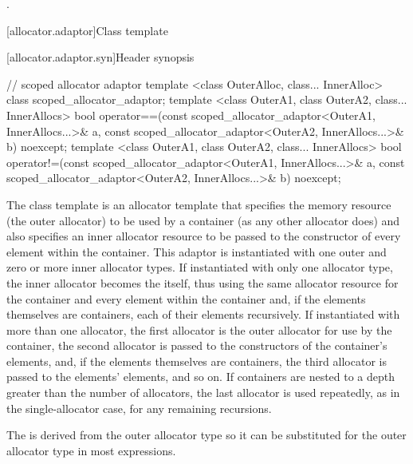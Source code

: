 \begin{itemdescr}
\pnum
\returns
{}.
\end{itemdescr}


[allocator.adaptor]{Class template }

[allocator.adaptor.syn]{Header  synopsis}

%
%
\begin{codeblock}
  // scoped allocator adaptor
  template <class OuterAlloc, class... InnerAlloc>
    class scoped_allocator_adaptor;
  template <class OuterA1, class OuterA2, class... InnerAllocs>
    bool operator==(const scoped_allocator_adaptor<OuterA1, InnerAllocs...>& a,
                    const scoped_allocator_adaptor<OuterA2, InnerAllocs...>& b) noexcept;
  template <class OuterA1, class OuterA2, class... InnerAllocs>
    bool operator!=(const scoped_allocator_adaptor<OuterA1, InnerAllocs...>& a,
                    const scoped_allocator_adaptor<OuterA2, InnerAllocs...>& b) noexcept;
\end{codeblock}

\pnum
The class template  is an allocator template that
specifies the memory resource (the outer allocator) to be used by a container (as any
other allocator does) and also specifies an inner allocator resource to be passed to the
constructor of every element within the container. This adaptor is instantiated with one
outer and zero or more inner allocator types. If instantiated with only one allocator
type, the inner allocator becomes the  itself, thus
using the same allocator resource for the container and every element within the
container and, if the elements themselves are containers, each of their elements
recursively. If instantiated with more than one allocator, the first allocator is the
outer allocator for use by the container, the second allocator is passed to the
constructors of the container's elements, and, if the elements themselves are
containers, the third allocator is passed to the elements' elements, and so on. If
containers are nested to a depth greater than the number of allocators, the last
allocator is used repeatedly, as in the single-allocator case, for any remaining
recursions. \begin{note} The  is derived from the outer
allocator type so it can be substituted for the outer allocator type in most
expressions. \end{note}

